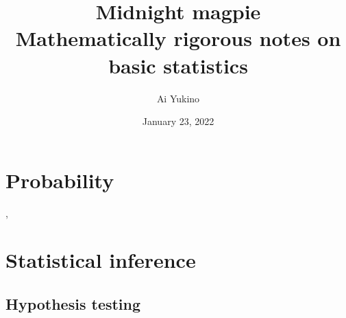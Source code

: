 \documentclass{article}
\begin{document}
\title{Midnight magpie \\
	\large Mathematically rigorous notes on basic statistics}
\author{Ai Yukino}
\date{January 23, 2022}
\maketitle
\hypersetup{linkcolor = internallinkcolor}
\tableofcontents
\hypersetup{linkcolor= .}

\section{Probability}

\cite{durrett2019}, \cite{tao2015}

\section{Statistical inference}

\cite{HoggMcKeanCraig2019}

\subsection{Hypothesis testing}

\cite{HoggMcKeanCraig2019}




\end{document}
